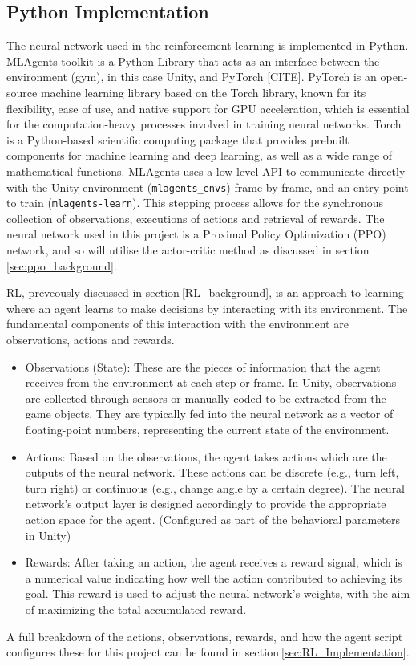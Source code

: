 \subsection{Python Implementation}
The neural network used in the reinforcement learning is implemented in Python. MLAgents toolkit is a Python Library that acts as an interface between the environment (gym), in this case Unity, and PyTorch [CITE]. PyTorch is an open-source machine learning library based on the Torch library, known for its flexibility, ease of use, and native support for GPU acceleration, which is essential for the computation-heavy processes involved in training neural networks. Torch is a Python-based scientific computing package that provides prebuilt components for machine learning and deep learning, as well as a wide range of mathematical functions. MLAgents uses a low level API to communicate directly with the Unity environment (\texttt{mlagents\_envs}) frame by frame, and an entry point to train (\texttt{mlagents-learn}). This stepping process allows for the synchronous collection of observations, executions of actions and retrieval of rewards. The neural network used in this project is a Proximal Policy Optimization (PPO) network, and so will utilise the actor-critic method as discussed in section$~$\ref{sec:ppo_background}.

RL, preveously discussed in section$~$\ref{RL_background}, is an approach to learning where an agent learns to make decisions by interacting with its environment. The fundamental components of this interaction with the environment are observations, actions and rewards.
\begin{itemize}
    \item Observations (State): These are the pieces of information that the agent receives from the environment at each step or frame. In Unity, observations are collected through sensors or manually coded to be extracted from the game objects. They are typically fed into the neural network as a vector of floating-point numbers, representing the current state of the environment.
    \item Actions: Based on the observations, the agent takes actions which are the outputs of the neural network. These actions can be discrete (e.g., turn left, turn right) or continuous (e.g., change angle by a certain degree). The neural network's output layer is designed accordingly to provide the appropriate action space for the agent. (Configured as part of the behavioral parameters in Unity)
    \item Rewards: After taking an action, the agent receives a reward signal, which is a numerical value indicating how well the action contributed to achieving its goal. This reward is used to adjust the neural network's weights, with the aim of maximizing the total accumulated reward.
\end{itemize}
A full breakdown of the actions, observations, rewards, and how the agent script configures these for this project can be found in section$~$\ref{sec:RL_Implementation}.

